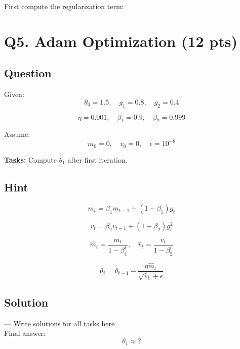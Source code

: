 \documentclass[11pt]{article}
\begin{document}
First compute the regularization term:

\section*{Q5. Adam Optimization (12 pts)}

\subsection*{Question}

Given:
\[
\theta_0=1.5,\quad g_1=0.8,\quad g_2=0.4
\]

\[
\eta=0.001,\quad \beta_1=0.9,\quad \beta_2=0.999
\]

Assume:
\[
m_0=0,\quad v_0=0,\quad \epsilon=10^{-8}
\]

\textbf{Tasks:} Compute $\theta_1$ after first iteration.

\subsection*{Hint}

\[
m_t=\beta_1m_{t-1}+(1-\beta_1)g_t
\]

\[
v_t=\beta_2v_{t-1}+(1-\beta_2)g_t^2
\]

\[
\hat{m}_t=\frac{m_t}{1-\beta_1^t},
\quad
\hat{v}_t=\frac{v_t}{1-\beta_2^t}
\]

\[
\theta_t=\theta_{t-1}
-
\frac{\eta\hat{m}_t}{\sqrt{\hat{v}_t}+\epsilon}
\]

\subsection*{Solution}

--- Write solutions for all tasks here\\


Final answer:
\[
\boxed{\theta_1\approx?}
\]
\end{document}
